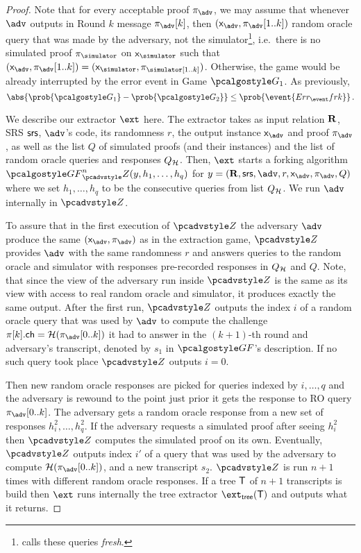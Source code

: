 \documentclass[runningheads,11pt]{llncs}
\theoremstyle{definition} \newtheorem{definition}[theorem]{Definition}
\begin{document}
\begin{proof}
   Note that for every acceptable proof
  $\zkproof_{\advse}$, we may assume that whenever $\advse$ outputs in Round $k$
  message $\zkproof_{\advse}[k]$, then
  $(\inp_{\advse}, \zkproof_{\advse}[1..k])$ random oracle query that was made
  by the adversary, not the simulator\footnote{\cite{INDOCRYPT:FKMV12} calls
    these queries \emph{fresh}.}, i.e.~there is no simulated proof
  $\zkproof_\simulator$ on $\inp_\simulator$ such that
  $(\inp_{\advse}, \zkproof_{\advse} [1..k]) = (\inp_\simulator,
  \zkproof_\simulator[1..k])$. Otherwise, the game would be already interrupted
  by the error event in Game $\game{1}$.  As previously,
\[
  \abs{\prob{\game{1}} - \prob{\game{2}}} \leq \prob{\event{\errfrk}}\,.
\]

We describe our extractor $\ext$ here. The extractor takes as input relation
$\mathbf{R}$, SRS $\mathsf{srs}$, $\advse$'s code, its randomness $r$, the output instance
$\inp_{\advse}$ and proof $\zkproof_{\advse}$, as well as the list $Q$ of
simulated proofs (and their instances) and the list of random oracle queries and
responses $Q_{\mathcal{H}}$. Then, $\ext$ starts a forking algorithm
$\genforking^{n}_\zdv(y,h_1, \ldots, h_q)$ for
$y = (\REL, \srs, \advse, r, \inp_{\advse}, \zkproof_{\advse}, Q)$ where we set
$h_1, \ldots, h_q$ to be the consecutive queries from list $Q_{\mathcal{H}}$. We run
$\advse$ internally in $\zdv$.%

To assure that in the first execution of $\zdv$ the adversary $\advse$ produce
the same $(\inp_{\advse}, \zkproof_{\advse})$ as in the extraction game, $\zdv$
provides $\advse$ with the same randomness $r$ and answers queries to the random
oracle and simulator with responses pre-recorded responses in $Q_{\mathcal{H}}$ and $Q$.
%
Note, that since the view of the adversary run inside $\zdv$ is the same as its
view with access to real random oracle and simulator, it produces exactly the
same output. After the first run, $\zdv$ outputs the index $i$ of a random oracle
query that was used by $\advse$ to compute the challenge $\zkproof[k].\ch =
\ro(\zkproof_{\advse}[0..k])$ it had to answer in the $(k + 1)$-th round and
adversary's transcript, denoted by $s_1$ in $\genforking$'s description. If no
such query took place $\zdv$ outputs $i = 0$.

Then new random oracle responses are picked for queries indexed by
$i, \ldots, q$ and the adversary is rewound to the point just prior it gets the
response to RO query $\zkproof_{\advse}[0..k]$. The adversary gets a random
oracle response from a new set of responses $h^2_i, \ldots, h^2_q$. If the
adversary requests a simulated proof after seeing $h^2_i$ then $\zdv$ computes
the simulated proof on its own. Eventually, $\zdv$ outputs index $i'$ of a query
that was used by the adversary to compute $\ro(\zkproof_{\advse}[0..k])$, and a
new transcript $s_2$. $\zdv$ is run $n + 1$ times with different random oracle
responses. If a tree $\mathsf{T}$ of $n + 1$ transcripts is build then $\ext$
runs internally the tree extractor $\extt(\tree)$ and outputs what it returns.


\end{proof}
\end{document}
